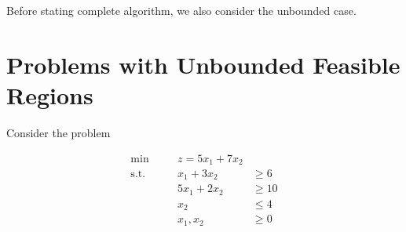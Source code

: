 Before stating complete algorithm, we also consider the unbounded case.

\section{Problems with Unbounded Feasible Regions}
Consider the problem

\begin{align*}
\min \quad && z = 5x_1 + 7x_2  \\ 
\text{s.t.} \quad && x_1 + 3x_2 &\geq 6 \\ 
&& 5x_1 + 2x_2 &\geq 10 \\ 
&& x_2 &\leq 4 \\ 
&& x_1, x_2 &\geq 0 
\end{align*}



